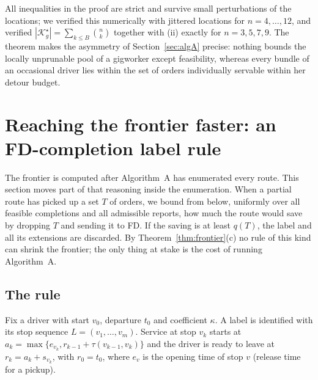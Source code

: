 \documentclass[review,12pt]{elsarticle}
\theoremstyle{definition}
\theoremstyle{remark}
\newcommand{\Kstar}{\mathcal{K}^\star}
\begin{document}
All inequalities in the proof are strict and survive small perturbations
of the locations; we verified this numerically with jittered locations for
$n=4,\dots,12$, and verified $|\Kstar_g|=\sum_{k\le B}\binom nk$ together
with (ii) exactly for $n=3,5,7,9$. The theorem makes the asymmetry of
Section~\ref{sec:algA} precise: nothing bounds the locally unprunable pool
of a gigworker except feasibility, whereas every bundle of an occasional
driver lies within the set of orders individually servable within her
detour budget.

\section{Reaching the frontier faster: an FD-completion label rule}
\label{sec:label}

The frontier is computed after Algorithm~A has enumerated every route. This
section moves part of that reasoning inside the enumeration. When a partial
route has picked up a set $T$ of orders, we bound from below, uniformly over
all feasible completions and all admissible reports, how much the route
would save by dropping $T$ and sending it to FD. If the saving is at least
$q(T)$, the label and all its extensions are discarded. By
Theorem~\ref{thm:frontier}(c) no rule of this kind can shrink the frontier;
the only thing at stake is the cost of running Algorithm~A.

\subsection{The rule}

Fix a driver with start $v_0$, departure $t_0$ and coefficient $\kappa$. A
label is identified with its stop sequence $L=(v_1,\dots,v_m)$. Service at
stop $v_k$ starts at $a_k=\max\{e_{v_k},r_{k-1}+\tau(v_{k-1},v_k)\}$ and the
driver is ready to leave at $r_k=a_k+s_{v_k}$, with $r_0=t_0$, where
$e_v$ is the opening time of stop $v$ (release time for a pickup).
\end{document}
